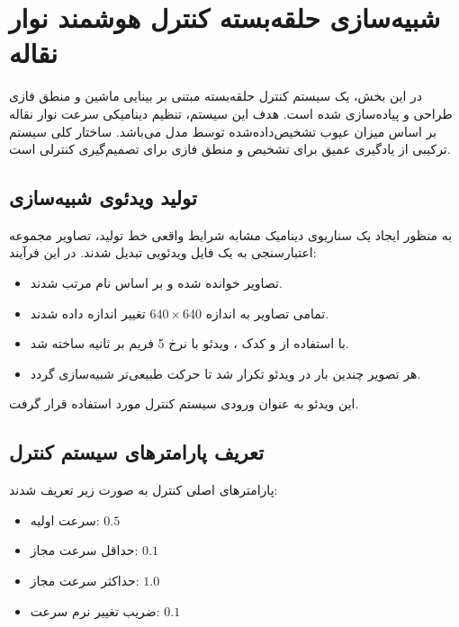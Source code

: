 \documentclass[a4paper, 10pt, twocolumn]{article}
\begin{document}
	
	\newpage
	\section{شبیه‌سازی حلقه‌بسته کنترل هوشمند نوار نقاله}
	
	در این بخش، یک سیستم کنترل حلقه‌بسته مبتنی بر بینایی ماشین و منطق فازی طراحی و پیاده‌سازی شده است. هدف این سیستم، تنظیم دینامیکی سرعت نوار نقاله بر اساس میزان عیوب تشخیص‌داده‌شده توسط مدل  می‌باشد. ساختار کلی سیستم ترکیبی از یادگیری عمیق برای تشخیص و منطق فازی برای تصمیم‌گیری کنترلی است.
	
	
	\subsection{تولید ویدئوی شبیه‌سازی}
	
	به منظور ایجاد یک سناریوی دینامیک مشابه شرایط واقعی خط تولید، تصاویر مجموعه اعتبارسنجی به یک فایل ویدئویی تبدیل شدند. در این فرآیند:
	
	\begin{itemize}
		\item تصاویر خوانده شده و بر اساس نام مرتب شدند.
		\item تمامی تصاویر به اندازه $640 \times 640$ تغییر اندازه داده شدند.
		\item با استفاده از  و کدک ، ویدئو با نرخ 5 فریم بر ثانیه ساخته شد.
		\item هر تصویر چندین بار در ویدئو تکرار شد تا حرکت طبیعی‌تر شبیه‌سازی گردد.
	\end{itemize}
	
	این ویدئو به عنوان ورودی سیستم کنترل مورد استفاده قرار گرفت.
	
	
	\subsection{تعریف پارامترهای سیستم کنترل}
	
	پارامترهای اصلی کنترل به صورت زیر تعریف شدند:
	
	\begin{itemize}
		\item سرعت اولیه: $0.5$
		\item حداقل سرعت مجاز: $0.1$
		\item حداکثر سرعت مجاز: $1.0$
		\item ضریب تغییر نرم سرعت: $0.1$
	\end{itemize}
	
\end{document}
